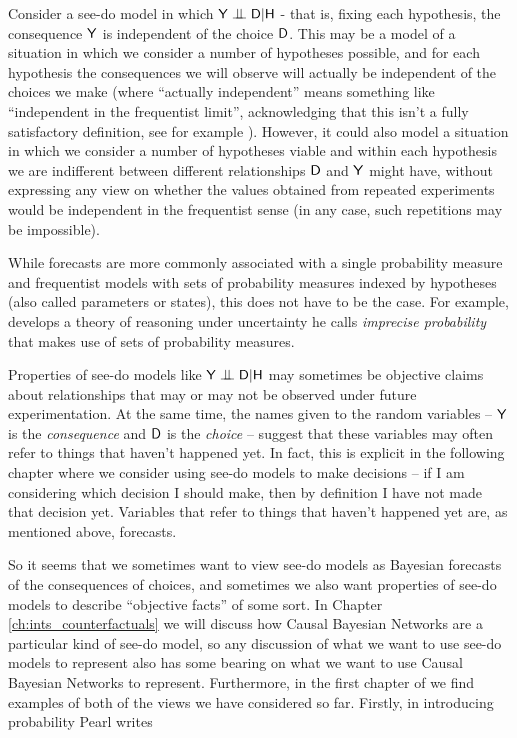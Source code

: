 Consider a see-do model in which $\RV{Y}\CI\RV{D}|\RV{H}$ - that is, fixing each hypothesis, the consequence $\mathsf{Y}$ is independent of the choice $\mathsf{D}$. This may be a model of a situation in which we consider a number of hypotheses possible, and for each hypothesis the consequences we will observe will actually be independent of the choices we make (where ``actually independent'' means something like ``independent in the frequentist limit'', acknowledging that this isn't a fully satisfactory definition, see for example \citet{hajek_interpretations_2019}).  However, it could also model a situation in which we consider a number of hypotheses viable and within each hypothesis we are indifferent between different relationships $\mathsf{D}$ and $\mathsf{Y}$ might have, without expressing any view on whether the values obtained from repeated experiments would be independent in the frequentist sense (in any case, such repetitions may be impossible).

While forecasts are more commonly associated with a single probability measure and frequentist models with sets of probability measures indexed by hypotheses (also called parameters or states), this does not have to be the case. For example, \citet{walley_statistical_1991} develops a theory of reasoning under uncertainty he calls \emph{imprecise probability} that makes use of sets of probability measures.

Properties of see-do models like $\RV{Y}\CI\RV{D}|\RV{H}$ may sometimes be objective claims about relationships that may or may not be observed under future experimentation. At the same time, the names given to the random variables -- $\mathsf{Y}$ is the \emph{consequence} and $\mathsf{D}$ is the \emph{choice} -- suggest that these variables may often refer to things that haven't happened yet. In fact, this is explicit in the following chapter where we consider using see-do models to make decisions -- if I am considering which decision I should make, then by definition I have not made that decision yet. Variables that refer to things that haven't happened yet are, as mentioned above, forecasts.

So it seems that we sometimes want to view see-do models as Bayesian forecasts of the consequences of choices, and sometimes we also want properties of see-do models to describe ``objective facts'' of some sort. In Chapter \ref{ch:ints_counterfactuals} we will discuss how Causal Bayesian Networks are a particular kind of see-do model, so any discussion of what we want to use see-do models to represent also has some bearing on what we want to use Causal Bayesian Networks to represent. Furthermore, in the first chapter of \citet{pearl_causality:_2009} we find examples of both of the views we have considered so far. Firstly, in introducing probability Pearl writes

